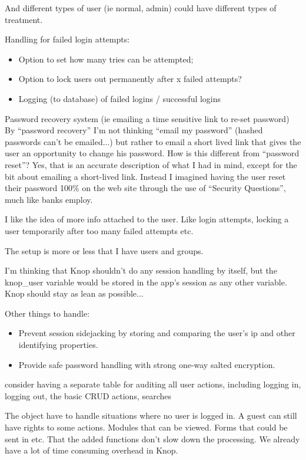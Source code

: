 \documentclass[letterpaper,10pt,english]{sphinxmanual}
\begin{document}
\begin{fulllineitems}
And different types of user (ie normal, admin) could have different types of treatment.

Handling for failed login attempts:
\begin{itemize}
\item {} 
Option to set how many tries can be attempted;

\item {} 
Option to lock users out permanently after x failed attempts?

\item {} 
Logging (to database) of failed logins / successful logins

\end{itemize}

Password recovery system (ie emailing a time sensitive link to re-set password)
By ``password recovery'' I'm not thinking ``email my password'' (hashed passwords can't be emailed...) but rather to email a short lived link that gives the user an opportunity to change his password. How is this different from ``password reset''?
Yes, that is an accurate description of what I had in mind, except for the bit about emailing a short-lived link.  Instead I imagined having the user reset their password 100\% on the web site through the use of ``Security Questions'', much like banks employ.

I like the idea of more info attached to the user. Like login attempts, locking a user temporarily after too many failed attempts etc.

The setup is more or less that I have users and groups.

I'm thinking that Knop shouldn't do any session handling by itself, but the knop\_user variable would be stored in the app's session as any other variable. Knop should stay as lean as possible...

Other things to handle:
\begin{itemize}
\item {} 
Prevent session sidejacking by storing and comparing the user's ip and other identifying properties.

\item {} 
Provide safe password handling with strong one-way salted encryption.

\end{itemize}

consider having a separate table for auditing all user actions, including logging in, logging out, the basic CRUD actions, searches

The object have to handle situations where no user is logged in. A guest can still have rights to some actions. Modules that can be viewed. Forms that could be sent in etc.
That the added functions don't slow down the processing. We already have a lot of time consuming overhead in Knop.


\end{fulllineitems}
\end{document}
